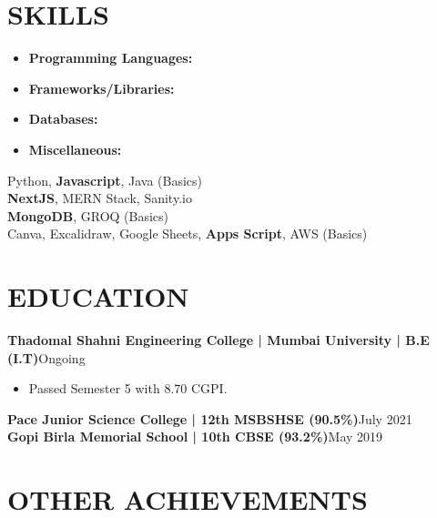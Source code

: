 \documentclass[a4paper,11pt]{article}
\newcommand{\entry}[2]{
  \noindent\textbf{#1}\hfill{#2}\\[-1em]
}
\newenvironment{itemizeWithPadding}{
  \begin{itemize}
}{
  \end{itemize}
  \vspace{0.5em} %
}
\begin{document}
\section*{SKILLS}
\vspace{-1.25em}
\begin{minipage}{0.3\textwidth}
    \begin{itemize}
        \item \textbf{Programming Languages:}
        \item \textbf{Frameworks/Libraries:}
        \item \textbf{Databases:}
        \item \textbf{Miscellaneous:}
    \end{itemize}
\end{minipage}
\begin{minipage}{0.7\textwidth}
    \vspace{1.75em}
    \setlength{\baselineskip}{1.2\baselineskip}  %
     Python, \textbf{Javascript}, Java (Basics)\\
     \textbf{NextJS}, MERN Stack, Sanity.io\\
     \textbf{MongoDB}, GROQ (Basics)\\
     Canva, Excalidraw, Google Sheets, \textbf{Apps Script}, AWS (Basics)\\    
\end{minipage}
\vspace{-2em}

\section*{EDUCATION}

\entry{Thadomal Shahni Engineering College | Mumbai University | B.E (I.T)}{Ongoing}
\begin{itemizeWithPadding}
  \item Passed Semester 5 with 8.70 CGPI.
\end{itemizeWithPadding}

\entry{Pace Junior Science College | 12th MSBSHSE (90.5\%)}{July 2021}

\entry{Gopi Birla Memorial School | 10th CBSE (93.2\%)}{May 2019}

\section*{OTHER ACHIEVEMENTS}
\end{document}
